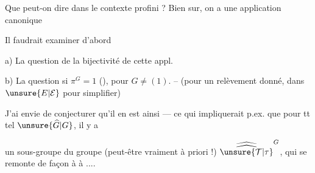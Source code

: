 Que peut-on dire dans le contexte profini ? Bien sur,
on a une application canonique

Il faudrait examiner d'abord

a) La question de la bijectivité de cette appl.

b) La question si $\pi^G=1$ (),
pour $G\ne(1)$. -- (pour un relèvement donné,
dans $\unsure{E|\mathcal E}$ pour simplifier)

J'ai envie de conjecturer 
qu'il en est ainsi --- ce qui impliquerait
p.ex. que pour tt tel  $\unsure{\widehat G|G}$, il y a


un sous-groupe   du groupe (peut-être vraiment  à priori !) $\widehat{\widehat{\unsure{\mathcal T|\tau}}}^{G}$, qui se remonte  de façon à  à ....

